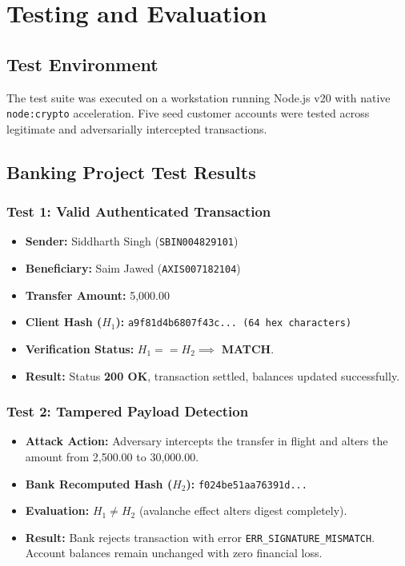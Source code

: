 \documentclass[11pt,a4paper]{article}
\newcommand{\INR}{\text{INR }}
\begin{document}
\section{Testing and Evaluation}

\subsection{Test Environment}
The test suite was executed on a workstation running Node.js v20 with native \texttt{node:crypto} acceleration. Five seed customer accounts were tested across legitimate and adversarially intercepted transactions.

\subsection{Banking Project Test Results}

\subsubsection{Test 1: Valid Authenticated Transaction}
\begin{itemize}
    \item \textbf{Sender:} Siddharth Singh (\texttt{SBIN004829101})
    \item \textbf{Beneficiary:} Saim Jawed (\texttt{AXIS007182104})
    \item \textbf{Transfer Amount:} \INR 5,000.00
    \item \textbf{Client Hash ($H_1$):} \texttt{a9f81d4b6807f43c... (64 hex characters)}
    \item \textbf{Verification Status:} $H_1 == H_2 \implies$ \textbf{MATCH}.
    \item \textbf{Result:} Status \textbf{200 OK}, transaction settled, balances updated successfully.
\end{itemize}

\subsubsection{Test 2: Tampered Payload Detection}
\begin{itemize}
    \item \textbf{Attack Action:} Adversary intercepts the transfer in flight and alters the amount from \INR 2,500.00 to \INR 30,000.00.
    \item \textbf{Bank Recomputed Hash ($H_2$):} \texttt{f024be51aa76391d...}
    \item \textbf{Evaluation:} $H_1 \neq H_2$ (avalanche effect alters digest completely).
    \item \textbf{Result:} Bank rejects transaction with error \texttt{ERR\_SIGNATURE\_MISMATCH}. Account balances remain unchanged with zero financial loss.
\end{itemize}
\end{document}
